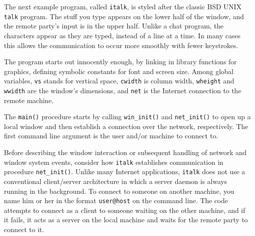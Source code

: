The next example program, called \texttt{italk}, is styled after the
classic BSD UNIX \texttt{talk} program. The stuff you type
appears on the lower half of the window, and the remote
party's input is in the upper half. Unlike a chat
program, the characters appear as they are typed, instead of a line at
a time. In many cases this allows the communication to occur more
smoothly with fewer keystrokes.

The program starts out innocently enough, by linking in library
functions for graphics, defining symbolic constants for font and screen
size. Among global variables, \texttt{vs} stands for vertical space,
\texttt{cwidth} is column width, \texttt{wheight} and \texttt{wwidth}
are the window's dimensions, and \texttt{net} is the
Internet connection to the remote machine.


The \texttt{main()} procedure starts by calling \texttt{win\_init()} and
\texttt{net\_init()} to open up a local window and then establish a
connection over the network, respectively. The first command line
argument is the user and/or machine to connect to.


Before describing the window interaction or subsequent handling of
network and window system events, consider how \texttt{italk}
establishes communication in procedure \texttt{net\_init()}. Unlike
many Internet applications, \texttt{italk} does not use a conventional
client/server architecture in which a server daemon is always running
in the background. To connect to someone on another machine, you name
him or her in the format \texttt{user@host} on the command line. The
code attempts to connect as a client to someone waiting on the other
machine, and if it fails, it acts as a server on the local machine and
waits for the remote party to connect to it.

